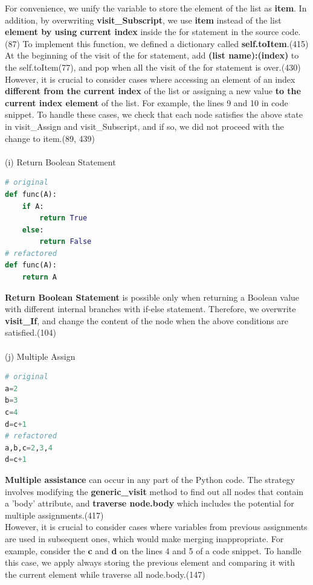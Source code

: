 \documentclass[11pt]{article}
\begin{document}
For convenience, we unify the variable to store the element of the list as \textbf{item}. In addition, by overwriting \textbf{visit\_Subscript}, we use \textbf{item} instead of the list \textbf{element by using current index} inside the for statement in the source code.(87) To implement this function, we defined a dictionary called \textbf{self.toItem}.(415) At the beginning of the visit of the for statement, add \textbf{(list name):(index)} to the self.toItem(77), and pop when all the visit of the for statement is over.(430)\\
However, it is crucial to consider cases where accessing an element of an index \textbf{different from the current index} of the list or assigning a new value \textbf{to the current index element} of the list. For example, the lines 9 and 10 in code snippet. To handle these cases, we check that each node satisfies the above state in visit\_Assign and visit\_Subscript, and if so, we did not proceed with the change to item.(89, 439)\\ \\
(i) Return Boolean Statement
\begin{lstlisting}[language=python]
# original
def func(A):
    if A:
        return True
    else:
        return False
# refactored
def func(A):
    return A
\end{lstlisting}
\textbf{Return Boolean Statement} is possible only when returning a Boolean value with different internal branches with if-else statement. Therefore, we overwrite \textbf{visit\_If}, and change the content of the node when the above conditions are satisfied.(104)\\ \\
(j) Multiple Assign
\begin{lstlisting}[language=python]
# original
a=2
b=3
c=4
d=c+1
# refactored
a,b,c=2,3,4
d=c+1
\end{lstlisting}
\textbf{Multiple assistance} can occur in any part of the Python code. The strategy involves modifying the \textbf{generic\_visit} method to find out all nodes that contain a 'body' attribute, and \textbf{traverse node.body} which includes the potential for multiple assignments.(417)\\
However, it is crucial to consider cases where variables from previous assignments are used in subsequent ones, which would make merging inappropriate. For example, consider the \textbf{c} and \textbf{d} on the lines 4 and 5 of a code snippet. To handle this case, we apply always storing the previous element and comparing it with the current element while traverse all node.body.(147)\\
\end{document}

